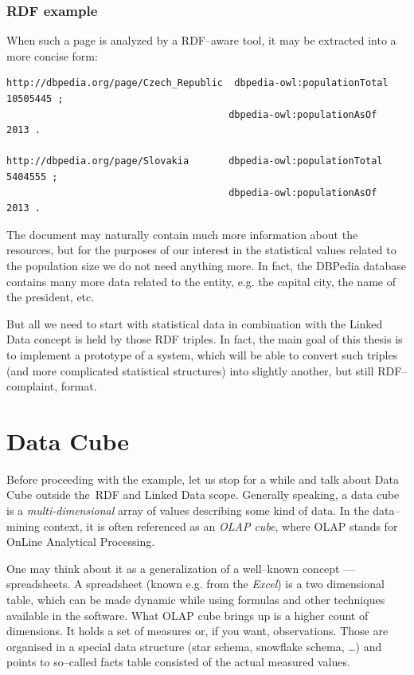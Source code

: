\subsubsection{RDF example}

When such a page is analyzed by a RDF--aware tool, it may be extracted into a more concise form:

\scriptsize\begin{verbatim}
http://dbpedia.org/page/Czech_Republic	dbpedia-owl:populationTotal		10505445 ;
                                       dbpedia-owl:populationAsOf		2013 .

http://dbpedia.org/page/Slovakia       dbpedia-owl:populationTotal		5404555 ;
                                       dbpedia-owl:populationAsOf		2013 .
\end{verbatim}\normalsize

The document may naturally contain much more information about the resources, but for the
purposes of our interest in the statistical values related to the population size we do not
need anything more. In fact, the DBPedia database contains many more data related to the entity,
e.g. the capital city, the name of the president, etc.

But all we need to start with statistical data in combination with the Linked Data concept is held
by those RDF triples. In fact, the main goal of this thesis is to implement a prototype of a 
system, which will be able to convert such triples (and more complicated statistical structures) into
slightly another, but still RDF--complaint, format.

\section{Data Cube}
\label{sec:datacube}
Before proceeding with the example, let us stop for a while and talk about Data Cube outside
the~RDF and Linked Data scope. Generally speaking, a data cube is a \emph{multi-dimensional}
 array of values describing some kind of data. In the
data--mining context, it is often referenced as an \emph{OLAP cube}, where OLAP stands for OnLine
Analytical Processing.

One may think about it as a generalization of a well--known concept --- spreadsheets.
A spreadsheet (known e.g. from the \emph{Excel}) is a two dimensional table, which can be
made dynamic while using formulas and other techniques available in the software. What
OLAP cube brings up is a higher count of dimensions. It holds a set of measures or, if you
want, observations. Those are organised in a special data structure (star schema, snowflake
schema, …) and points to so--called facts table consisted of the actual measured values.

